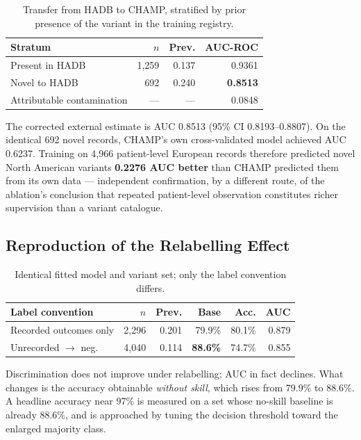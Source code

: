 \documentclass[conference]{IEEEtran}
\begin{document}
\begin{table}[!t]
\caption{Transfer from HADB to CHAMP, stratified by prior presence of the
variant in the training registry.}
\label{tab:transfer}
\centering
\footnotesize
\begin{tabular}{lrrr}
\toprule
Stratum & $n$ & Prev. & AUC-ROC \\
\midrule
Present in HADB            & 1,259 & 0.137 & 0.9361 \\
Novel to HADB              & 692   & 0.240 & \textbf{0.8513} \\
Attributable contamination & ---   & ---   & 0.0848 \\
\bottomrule
\end{tabular}
\end{table}

The corrected external estimate is AUC 0.8513 (95\% CI 0.8193--0.8807). On the
identical 692 novel records, CHAMP's own cross-validated model achieved AUC
0.6237. Training on 4{,}966 patient-level European records therefore predicted
novel North American variants \textbf{0.2276 AUC better} than CHAMP predicted
them from its own data --- independent confirmation, by a different route, of
the ablation's conclusion that repeated patient-level observation constitutes
richer supervision than a variant catalogue.

\subsection{Reproduction of the Relabelling Effect}

\begin{table}[!t]
\caption{Identical fitted model and variant set; only the label convention
differs.}
\label{tab:relabel}
\centering
\footnotesize
\begin{tabular}{lrrrrr}
\toprule
Label convention & $n$ & Prev. & Base & Acc. & AUC \\
\midrule
Recorded outcomes only        & 2,296 & 0.201 & 79.9\% & 80.1\% & 0.879 \\
Unrecorded $\rightarrow$ neg. & 4,040 & 0.114 & \textbf{88.6\%} & 74.7\% & 0.855 \\
\bottomrule
\end{tabular}
\end{table}

Discrimination does not improve under relabelling; AUC in fact declines. What
changes is the accuracy obtainable \textit{without skill}, which rises from
79.9\% to 88.6\%. A headline accuracy near 97\% is measured on a set whose
no-skill baseline is already 88.6\%, and is approached by tuning the decision
threshold toward the enlarged majority class.
\end{document}

